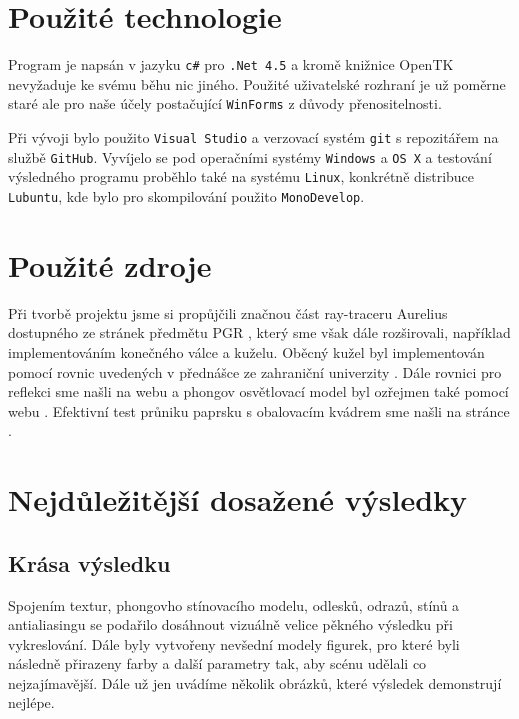 \documentclass[12pt,a4paper,titlepage,final]{report}
\begin{document}
\chapter{Použité technologie}
Program je napsán v jazyku \texttt{c\#} pro \texttt{.Net 4.5} a kromě knižnice OpenTK nevyžaduje ke svému běhu nic jiného. Použité uživatelské rozhraní je už poměrne staré ale pro naše účely postačující \texttt{WinForms} z důvody přenositelnosti.

Při vývoji bylo použito \texttt{Visual Studio} a verzovací systém \texttt{git} s repozitářem na službě \texttt{GitHub}. Vyvíjelo se pod operačními systémy \texttt{Windows} a \texttt{OS X} a testování výsledného programu proběhlo také na systému \texttt{Linux}, konkrétně distribuce \texttt{Lubuntu}, kde bylo pro skompilování použito \texttt{MonoDevelop}.


\begingroup
\let\clearpage\relax
\chapter{Použité zdroje}
Při tvorbě projektu jsme si propůjčili značnou část ray-traceru Aurelius dostupného ze stránek předmětu PGR \cite{aurelius}, který sme však dále rozširovali, například implementováním konečného válce a kuželu. Oběcný kužel byl implementován pomocí rovnic uvedených v přednášce ze zahraniční univerzity \cite{cone}. Dále rovnici pro reflekci sme našli na webu \cite{reflect} a phongov osvětlovací model byl ozřejmen také pomocí webu \cite{phong}. Efektivní test průniku paprsku s obalovacím kvádrem sme našli na stránce \cite{aabb}.

\endgroup

\chapter{Nejdůležitější dosažené výsledky}

\section{Krása výsledku}

Spojením textur, phongovho stínovacího modelu, odlesků, odrazů, stínů a antialiasingu se podařilo dosáhnout vizuálně velice pěkného výsledku při vykreslování. Dále byly vytvořeny nevšední modely figurek, pro které byli následně přirazeny farby a další parametry tak, aby scénu udělali co nejzajímavější. Dále už jen uvádíme několik obrázků, které výsledek demonstrují nejlépe.
\end{document}

